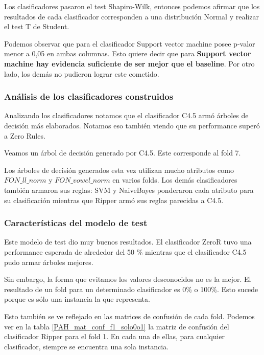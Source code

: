 Los clasificadores pasaron el test Shapiro-Wilk, entonces podemos afirmar que los resultados de cada clasificador corresponden a una distribución Normal y realizar el test T de Student.

Podemos observar que para el clasificador Support vector machine posee p-valor menor a 0,05 en ambas columnas. Esto quiere decir que para \textbf{Support vector machine hay evidencia suficiente de ser mejor que el baseline}. Por otro lado, los demás no pudieron lograr este cometido. 

\subsubsection{Análisis de los clasificadores construidos}

Analizando los clasificadores notamos que el clasificador C4.5 armó árboles de decisión más elaborados. Notamos eso también viendo que su performance superó a Zero Rules. 

Veamos un árbol de decisión generado por C4.5. Este corresponde al fold 7. 

Los árboles de decisión generados esta vez utilizan mucho  atributos como $FON\_ll\_norm$ y $FON\_vowel\_norm$ en varios folds. Los demás clasificadores también armaron sus reglas: SVM y NaiveBayes ponderaron cada atributo para su clasificación mientras que Ripper armó sus reglas parecidas a C4.5. 

\subsubsection{Características del modelo de test}

Este modelo de test dio muy buenos resultados. El clasificador ZeroR tuvo una performance esperada de alrededor del 50 \% mientras que el clasificador C4.5 pudo armar árboles mejores. 

Sin embargo, la forma que evitamos los valores desconocidos no es la mejor. El resultado de un fold para un determinado clasificador es 0\% o 100\%. Esto sucede porque es sólo una instancia la que representa. 

Esto también se ve reflejado en las matrices de confusión de cada fold. Podemos ver en la tabla \ref{PAH_mat_conf_f1_solo0o1} la matriz de confusión del clasificador Ripper para el fold 1. En cada una de ellas, para cualquier clasificador, siempre se encuentra una sola instancia. 

